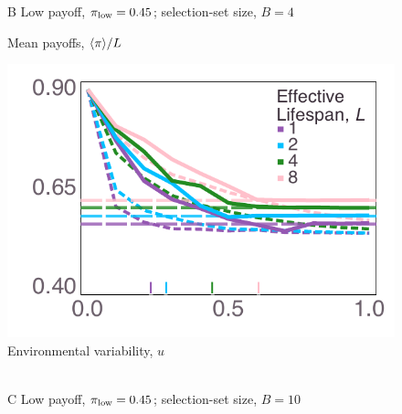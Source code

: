 \documentclass[letterpaper,11.5pt]{scrartcl}
\begin{document}
\begin{figure}
    {\textsf B \quad Low payoff, $\pi_{\mathrm{low}} = 0.45$; selection-set size, $B = 4$} \\
    \begin{minipage}[]{0.4\textwidth}
      \centering
      \begin{rotate}{90}
        {\parbox{3.0in}{
            \centering
            {\hspace{-7em} Mean payoffs, $\langle \pi \rangle / L$}
        }}
      \end{rotate}%
      \includegraphics[width=\textwidth]{Figures/mean_prev_net_payoff_over_u_lowpayoff=0.45_nbehaviors=4.pdf}
      \\[-0.8em]
      {\centering \quad Environmental variability, $u$}
    \end{minipage} \\[1.5em]
    {\textsf C \quad Low payoff, $\pi_{\mathrm{low}} = 0.45$; selection-set size, $B = 10$} \\
    \begin{minipage}[]{0.4\textwidth}
      \centering
      \begin{rotate}{90}
        {\parbox{3.0in}{
            \centering
}}
\end{rotate}
\end{minipage}
\end{figure}
\end{document}

